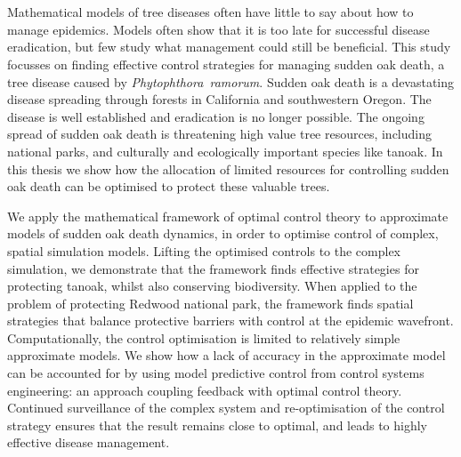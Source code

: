 %


{\chapter*{}}
\label{sec:abstract}
\vspace*{-10mm}

\begin{center}
    {\Large\thesisTitle}
    
    \vspace*{5mm}
    
    {\large\thesisName}
    \vspace*{10mm}
\end{center}

Mathematical models of tree diseases often have little to say about how to manage epidemics. Models often show that it is too late for successful disease eradication, but few study what management could still be beneficial. This study focusses on finding effective control strategies for managing sudden oak death, a tree disease caused by \emph{Phytophthora~ramorum}. Sudden oak death is a devastating disease spreading through forests in California and southwestern Oregon. The disease is well established and eradication is no longer possible. The ongoing spread of sudden oak death is threatening high value tree resources, including national parks, and culturally and ecologically important species like tanoak. In this thesis we show how the allocation of limited resources for controlling sudden oak death can be optimised to protect these valuable trees.

We apply the mathematical framework of optimal control theory to approximate models of sudden oak death dynamics, in order to optimise control of complex, spatial simulation models. Lifting the optimised controls to the complex simulation, we demonstrate that the framework finds effective strategies for protecting tanoak, whilst also conserving biodiversity. When applied to the problem of protecting Redwood national park, the framework finds spatial strategies that balance protective barriers with control at the epidemic wavefront. Computationally, the control optimisation is limited to relatively simple approximate models. We show how a lack of accuracy in the approximate model can be accounted for by using model predictive control from control systems engineering: an approach coupling feedback with optimal control theory. Continued surveillance of the complex system and re-optimisation of the control strategy ensures that the result remains close to optimal, and leads to highly effective disease management.

